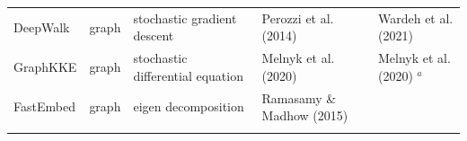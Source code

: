 \documentclass[11pt]{article}
\begin{document}
\begin{longtable}[]{@{}lllll@{}}
\begin{minipage}[t]{0.09\columnwidth}\raggedright
DeepWalk\strut
\end{minipage} & \begin{minipage}[t]{0.11\columnwidth}\raggedright
graph\strut
\end{minipage} & \begin{minipage}[t]{0.23\columnwidth}\raggedright
stochastic gradient descent\strut
\end{minipage} & \begin{minipage}[t]{0.14\columnwidth}\raggedright
Perozzi et al. (2014)\strut
\end{minipage} & \begin{minipage}[t]{0.29\columnwidth}\raggedright
Wardeh et al. (2021)\strut
\end{minipage}\tabularnewline
\begin{minipage}[t]{0.09\columnwidth}\raggedright
GraphKKE\strut
\end{minipage} & \begin{minipage}[t]{0.11\columnwidth}\raggedright
graph\strut
\end{minipage} & \begin{minipage}[t]{0.23\columnwidth}\raggedright
stochastic differential equation\strut
\end{minipage} & \begin{minipage}[t]{0.14\columnwidth}\raggedright
Melnyk et al. (2020)\strut
\end{minipage} & \begin{minipage}[t]{0.29\columnwidth}\raggedright
Melnyk et al. (2020) \(^a\)\strut
\end{minipage}\tabularnewline
\begin{minipage}[t]{0.09\columnwidth}\raggedright
FastEmbed\strut
\end{minipage} & \begin{minipage}[t]{0.11\columnwidth}\raggedright
graph\strut
\end{minipage} & \begin{minipage}[t]{0.23\columnwidth}\raggedright
eigen decomposition\strut
\end{minipage} & \begin{minipage}[t]{0.14\columnwidth}\raggedright
Ramasamy \& Madhow (2015)\strut
\end{minipage} & \begin{minipage}[t]{0.29\columnwidth}\raggedright
\strut
\end{minipage}\tabularnewline
\begin{minipage}[t]{0.09\columnwidth}\raggedright

\end{minipage}
\end{longtable}
\end{document}
